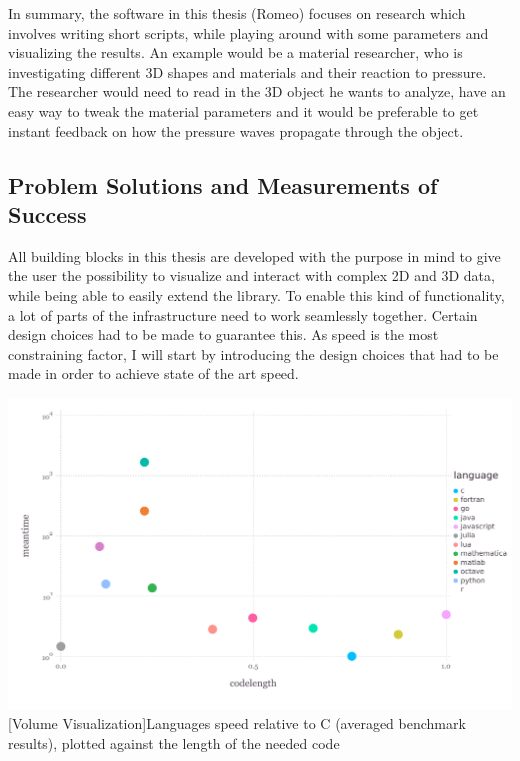 In summary, the software in this thesis (Romeo) focuses on research which involves writing short scripts, while playing around with some parameters and visualizing the results. 
An example would be a material researcher, who is investigating different 3D shapes and materials and their reaction to pressure.
The researcher would need to read in the 3D object he wants to analyze, have an easy way to tweak the material parameters and it would be preferable to get instant feedback on how the pressure waves propagate through the object.


\subsection{Problem Solutions and Measurements of Success}

All building blocks in this thesis are developed with the purpose in mind to give the user the possibility to visualize and interact with complex 2D and 3D data, while being able to easily extend the library.
To enable this kind of functionality, a lot of parts of the infrastructure need to work seamlessly together.
Certain design choices had to be made to guarantee this. As speed is the most constraining factor, I will start by introducing the design choices that had to be made in order to achieve state of the art speed.

\vspace{1em}
\begin{minipage}{\linewidth}
    \centering
    \includegraphics[width=0.9\linewidth]{graphics/julia_bench.pdf}
    [Volume Visualization]{Languages speed relative to C (averaged benchmark results), plotted against the length of the needed code}
    \label{fig:juliabench}
\end{minipage}

